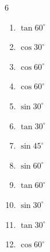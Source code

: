 \begin{multicols}{6}
\begin{enumerate}
  \item $\displaystyle \tan{60^\circ}$


  \item $\displaystyle \cos{30^\circ}$


  \item $\displaystyle \cos{60^\circ}$


  \item $\displaystyle \cos{60^\circ}$


  \item $\displaystyle \sin{30^\circ}$


  \item $\displaystyle \tan{30^\circ}$


  \item $\displaystyle \sin{45^\circ}$


  \item $\displaystyle \sin{60^\circ}$


\columnbreak %

\resetques

  \item $\displaystyle \tan{60^\circ}$


  \item $\displaystyle \sin{30^\circ}$


  \item $\displaystyle \tan{30^\circ}$


  \item $\displaystyle \cos{60^\circ}$



\end{enumerate}
\end{multicols}
